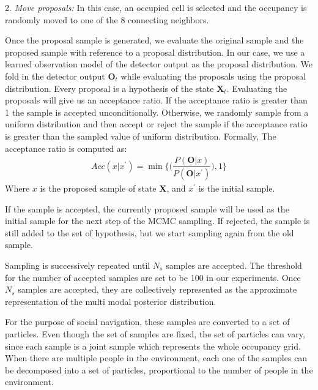 2. \textit{Move proposals:}
In this case, an occupied cell is selected and the occupancy is randomly moved to one of the 8 connecting neighbors.

Once the proposal sample is generated, we evaluate the original sample and the proposed sample with reference to a proposal distribution. In our case, we use a learned observation model of the detector output as the proposal distribution. We fold in the detector output $\textbf{O}_{t}$ while evaluating the proposals using the proposal distribution. Every proposal is a hypothesis of the state $\textbf{X}_{t}$.
Evaluating the proposals will give us an acceptance ratio. If the acceptance ratio is greater than 1 the sample is accepted unconditionally. 
Otherwise, we randomly sample from a uniform distribution and then accept or reject the sample if the acceptance ratio is greater than the sampled value of uniform distribution. Formally,
The acceptance ratio is computed as:
\begin{align}
Acc(x|x^{'}) = \min\Big\lbrace\Big(\dfrac{P(\textbf{O}|x)}{P(\textbf{O}|x^{'})}\Big),1\Big\rbrace
\end{align}
Where $x$ is the proposed sample of state \textbf{X}, and $x^{'}$ is the initial sample.

If the sample is accepted, the currently proposed sample will be used as the initial sample for the next step of the MCMC sampling. If rejected, the sample is still added to the set of hypothesis, but we start sampling again from the old sample.


Sampling is successively repeated until $N_{s}$ samples are accepted. The threshold for the number of accepted samples are set to be 100 in our experiments. Once $N_{s}$ samples are accepted, they are collectively represented as the approximate representation of the multi modal posterior distribution. 

For the purpose of social navigation, these samples are converted to a set of particles. Even though the set of samples are fixed, the set of particles can vary, since each sample is a joint sample which represents the whole occupancy grid. When there are multiple people in the environment, each one of the samples can be decomposed into a set of particles, proportional to the number of people in the environment. %